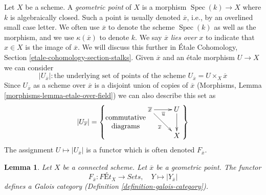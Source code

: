 \documentclass{stacks-project}
\theoremstyle{plain}
\newtheorem{lemma}[subsection]{Lemma}
\theoremstyle{definition}
\theoremstyle{remark}
\numberwithin{equation}{subsection}
\def\Spec{\mathop{\mathrm{Spec}}}
\begin{document}
\noindent
Let $X$ be a scheme. A {\it geometric point} of $X$ is a morphism
$\Spec(k) \to X$ where $k$ is algebraically closed. Such a point is
usually denoted $\overline{x}$, i.e., by an overlined small case letter.
We often use $\overline{x}$ to denote the scheme $\Spec(k)$ as well as
the morphism, and we use $\kappa(\overline{x})$
to denote $k$. We say $\overline{x}$ {\it lies over} $x$
to indicate that $x \in X$ is the image of $\overline{x}$.
We will discuss this further in
\'Etale Cohomology, Section \ref{etale-cohomology-section-stalks}.
Given $\overline{x}$ and an \'etale morphism $U \to X$ we can
consider
$$
|U_{\overline{x}}| : \text{the underlying set of points of the
scheme }U_{\overline{x}} = U \times_X \overline{x}
$$
Since $U_{\overline{x}}$ as a scheme over $\overline{x}$
is a disjoint union of copies of $\overline{x}$
(Morphisms, Lemma \ref{morphisms-lemma-etale-over-field})
we can also describe this set as
$$
|U_{\overline{x}}| =
\left\{
\begin{matrix}
\text{commutative} \\
\text{diagrams}
\end{matrix}
\vcenter{
\xymatrix{
\overline{x} \ar[rd]_{\overline{x}} \ar[r]_{\overline{u}} & U \ar[d] \\
& X
}
}
\right\}
$$
The assignment $U \mapsto |U_{\overline{x}}|$ is a functor
which is often denoted $F_{\overline{x}}$.

\begin{lemma}
\label{lemma-finite-etale-connected-galois-category}
Let $X$ be a connected scheme. Let $\overline{x}$ be a geometric point.
The functor
$$
F_{\overline{x}} : \textit{F\'Et}_X \longrightarrow \textit{Sets},\quad
Y \longmapsto |Y_{\overline{x}}|
$$
defines a Galois category (Definition \ref{definition-galois-category}).
\end{lemma}
\end{document}
